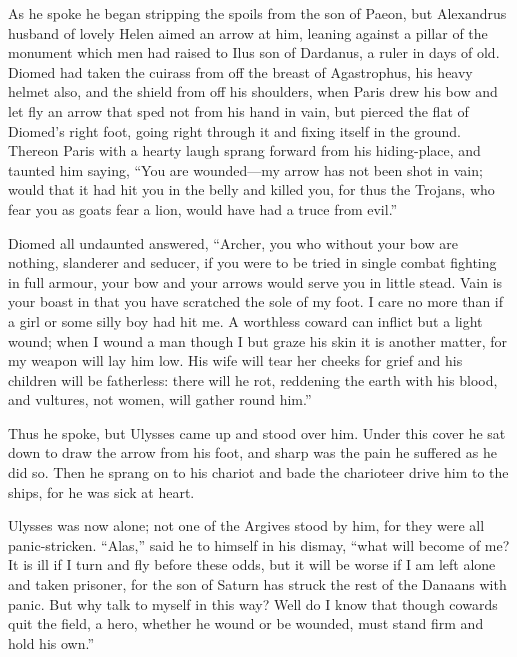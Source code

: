 As he spoke he began stripping the spoils from the son of Paeon, but
Alexandrus husband of lovely Helen aimed an arrow at him, leaning against
a pillar of the monument which men had raised to Ilus son of Dardanus, a
ruler in days of old. Diomed had taken the cuirass from off the breast of
Agastrophus, his heavy helmet also, and the shield from off his shoulders,
when Paris drew his bow and let fly an arrow that sped not from his hand
in vain, but pierced the flat of Diomed’s right foot, going right through
it and fixing itself in the ground. Thereon Paris with a hearty laugh
sprang forward from his hiding-place, and taunted him saying, “You are
wounded—my arrow has not been shot in vain; would that it had hit
you in the belly and killed you, for thus the Trojans, who fear you as
goats fear a lion, would have had a truce from evil.”

Diomed all undaunted answered, “Archer, you who without your bow are
nothing, slanderer and seducer, if you were to be tried in single combat
fighting in full armour, your bow and your arrows would serve you in
little stead. Vain is your boast in that you have scratched the sole of my
foot. I care no more than if a girl or some silly boy had hit me. A
worthless coward can inflict but a light wound; when I wound a man though
I but graze his skin it is another matter, for my weapon will lay him low.
His wife will tear her cheeks for grief and his children will be
fatherless: there will he rot, reddening the earth with his blood, and
vultures, not women, will gather round him.”

Thus he spoke, but Ulysses came up and stood over him. Under this cover he
sat down to draw the arrow from his foot, and sharp was the pain he
suffered as he did so. Then he sprang on to his chariot and bade the
charioteer drive him to the ships, for he was sick at heart.

Ulysses was now alone; not one of the Argives stood by him, for they were
all panic-stricken. “Alas,” said he to himself in his dismay, “what will
become of me? It is ill if I turn and fly before these odds, but it will
be worse if I am left alone and taken prisoner, for the son of Saturn has
struck the rest of the Danaans with panic. But why talk to myself in this
way? Well do I know that though cowards quit the field, a hero, whether he
wound or be wounded, must stand firm and hold his own.”

